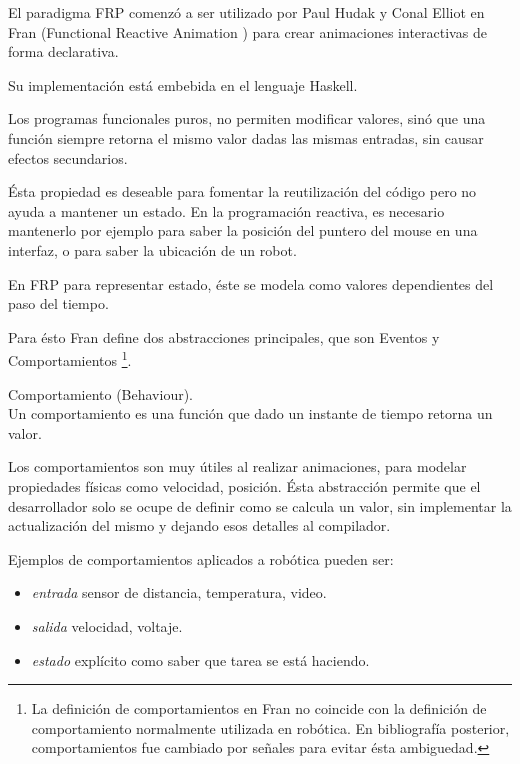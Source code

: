 

El paradigma FRP comenzó a ser utilizado por Paul Hudak y Conal Elliot en
Fran (Functional Reactive Animation \cite{ElliottHudak97:Fran})
para crear animaciones interactivas de forma declarativa.

Su implementación está embebida en el lenguaje Haskell.

Los programas funcionales puros, no permiten modificar valores,
sinó que una función siempre retorna el mismo valor dadas las mismas
entradas, sin causar efectos secundarios.

Ésta propiedad es deseable para fomentar la reutilización del código
pero no ayuda a mantener un estado.
En la programación reactiva, es necesario mantenerlo por
ejemplo para saber la posición del puntero del mouse en una interfaz,
o para saber la ubicación de un robot.

En FRP para representar estado, éste se modela como valores dependientes
del paso del tiempo.

Para ésto Fran define dos abstracciones principales,
que son Eventos y Comportamientos
\footnote{La definición de comportamientos en Fran no coincide con
la definición de comportamiento normalmente utilizada en robótica.
En bibliografía posterior, comportamientos fue cambiado por señales
para evitar ésta ambiguedad.}.

\begin{definicion}
  Comportamiento (Behaviour).\\

  Un comportamiento es una función que dado un instante de tiempo
  retorna un valor.


\end{definicion}

  Los comportamientos son muy útiles al realizar animaciones,
para modelar propiedades físicas como velocidad, posición.
  Ésta abstracción permite que el desarrollador solo se ocupe de
definir como se calcula un valor, sin implementar la actualización
del mismo y dejando esos detalles al compilador.

  Ejemplos de comportamientos aplicados a robótica pueden ser:

\begin{itemize}
  \item \textit{entrada} sensor de distancia, temperatura, video.
  \item \textit{salida} velocidad, voltaje.
  \item \textit{estado} explícito como saber que tarea se está haciendo.
\end{itemize}

